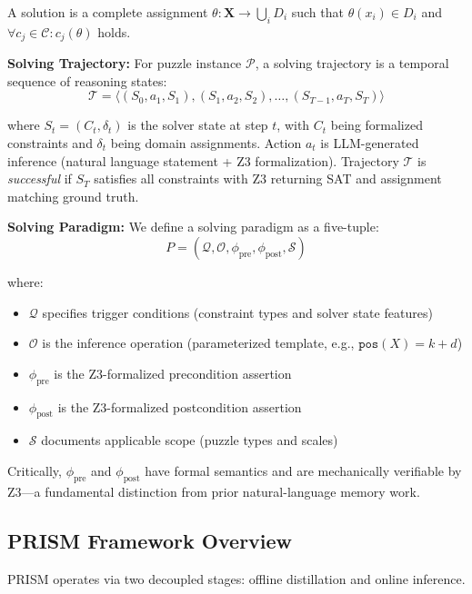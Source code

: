 \documentclass[letterpaper]{article}
\begin{document}
A solution is a complete assignment $\theta: \mathbf{X} \to \bigcup_i D_i$ such that $\theta(x_i) \in D_i$ and $\forall c_j \in \mathcal{C}: c_j(\theta)$ holds.

\textbf{Solving Trajectory:} For puzzle instance $\mathcal{P}$, a solving trajectory is a temporal sequence of reasoning states:
$$\mathcal{T} = \langle (S_0, a_1, S_1), (S_1, a_2, S_2), \ldots, (S_{T-1}, a_T, S_T) \rangle$$

where $S_t = (C_t, \delta_t)$ is the solver state at step $t$, with $C_t$ being formalized constraints and $\delta_t$ being domain assignments. Action $a_t$ is LLM-generated inference (natural language statement + Z3 formalization). Trajectory $\mathcal{T}$ is \textit{successful} if $S_T$ satisfies all constraints with Z3 returning SAT and assignment matching ground truth.

\textbf{Solving Paradigm:} We define a solving paradigm as a five-tuple:
$$P = (\mathcal{Q}, \mathcal{O}, \phi_{\text{pre}}, \phi_{\text{post}}, \mathcal{S})$$

where:
\begin{itemize}
    \item $\mathcal{Q}$ specifies trigger conditions (constraint types and solver state features)
    \item $\mathcal{O}$ is the inference operation (parameterized template, e.g., $\texttt{pos}(X) = k + d$)
    \item $\phi_{\text{pre}}$ is the Z3-formalized precondition assertion
    \item $\phi_{\text{post}}$ is the Z3-formalized postcondition assertion
    \item $\mathcal{S}$ documents applicable scope (puzzle types and scales)
\end{itemize}

Critically, $\phi_{\text{pre}}$ and $\phi_{\text{post}}$ have formal semantics and are mechanically verifiable by Z3—a fundamental distinction from prior natural-language memory work.

\subsection{PRISM Framework Overview}

PRISM operates via two decoupled stages: offline distillation and online inference.
\end{document}
